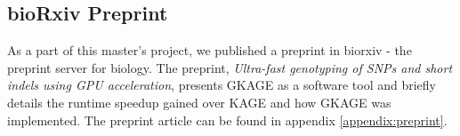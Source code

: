 \subsection{bioRxiv Preprint}
As a part of this master's project, we published a preprint \cite{preprint} in biorxiv - the preprint server for biology.
The preprint, \textit{Ultra-fast genotyping of SNPs and short indels using GPU acceleration}, presents GKAGE as a software tool and briefly details the runtime speedup gained over KAGE and how GKAGE was implemented.
The preprint article can be found in appendix \ref{appendix:preprint}.

